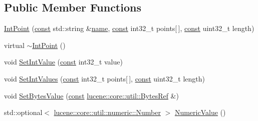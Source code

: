 \subsection*{Public Member Functions}
\begin{DoxyCompactItemize}
\item 
\mbox{\hyperlink{classlucene_1_1core_1_1document_1_1IntPoint_aa133857ccc70fbb2b8933d5ecaa46fb5}{Int\+Point}} (\mbox{\hyperlink{ZlibCrc32_8h_a2c212835823e3c54a8ab6d95c652660e}{const}} std\+::string \&\mbox{\hyperlink{classlucene_1_1core_1_1document_1_1Field_a52f673f3b3abb14b180f5159f4726537}{name}}, \mbox{\hyperlink{ZlibCrc32_8h_a2c212835823e3c54a8ab6d95c652660e}{const}} int32\+\_\+t points\mbox{[}$\,$\mbox{]}, \mbox{\hyperlink{ZlibCrc32_8h_a2c212835823e3c54a8ab6d95c652660e}{const}} uint32\+\_\+t length)
\item 
virtual \mbox{\hyperlink{classlucene_1_1core_1_1document_1_1IntPoint_ab5b682c697ecaf6a3c4081c786944b60}{$\sim$\+Int\+Point}} ()
\item 
void \mbox{\hyperlink{classlucene_1_1core_1_1document_1_1IntPoint_a49cd2286ec4ffa46d868eea812d85234}{Set\+Int\+Value}} (\mbox{\hyperlink{ZlibCrc32_8h_a2c212835823e3c54a8ab6d95c652660e}{const}} int32\+\_\+t value)
\item 
void \mbox{\hyperlink{classlucene_1_1core_1_1document_1_1IntPoint_a880e94ed4c6162b469cc23846ea8bc2e}{Set\+Int\+Values}} (\mbox{\hyperlink{ZlibCrc32_8h_a2c212835823e3c54a8ab6d95c652660e}{const}} int32\+\_\+t points\mbox{[}$\,$\mbox{]}, \mbox{\hyperlink{ZlibCrc32_8h_a2c212835823e3c54a8ab6d95c652660e}{const}} uint32\+\_\+t length)
\item 
void \mbox{\hyperlink{classlucene_1_1core_1_1document_1_1IntPoint_a288c85e2568bf186de1dac119c91ae2f}{Set\+Bytes\+Value}} (\mbox{\hyperlink{ZlibCrc32_8h_a2c212835823e3c54a8ab6d95c652660e}{const}} \mbox{\hyperlink{classlucene_1_1core_1_1util_1_1BytesRef}{lucene\+::core\+::util\+::\+Bytes\+Ref}} \&)
\item 
std\+::optional$<$ \mbox{\hyperlink{classlucene_1_1core_1_1util_1_1numeric_1_1Number}{lucene\+::core\+::util\+::numeric\+::\+Number}} $>$ \mbox{\hyperlink{classlucene_1_1core_1_1document_1_1IntPoint_a738e9e2cc41c77f835aac8f06da801ac}{Numeric\+Value}} ()
\end{DoxyCompactItemize}
